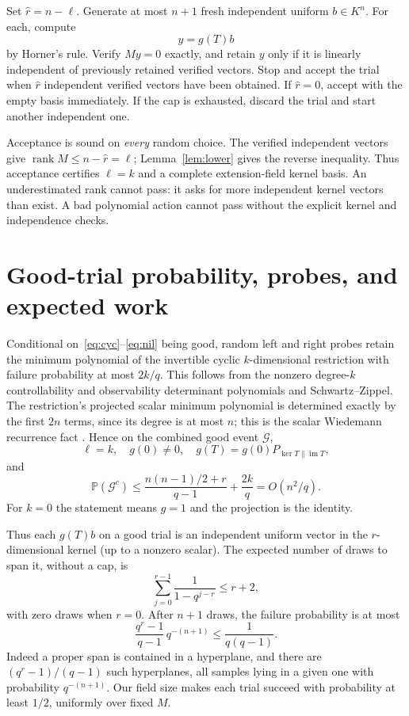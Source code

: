 \documentclass[11pt]{article}
\newcommand{\rank}{\operatorname{rank}}
\newcommand{\Prob}{\mathbb P}
\begin{document}
Set $\widehat r=n-\ell$. Generate at most $n+1$ fresh independent
uniform $b\in K^n$. For each, compute
\[
 y=g(T)b
\]
by Horner's rule. Verify $My=0$ exactly, and retain $y$ only if it
is linearly independent of previously retained verified vectors.
Stop and accept the trial when $\widehat r$ independent verified
vectors have been obtained. If $\widehat r=0$, accept with the empty
basis immediately. If the cap is exhausted, discard the trial and
start another independent one.

Acceptance is sound on \emph{every} random choice. The verified
independent vectors give $\rank M\le n-\widehat r=\ell$;
Lemma~\ref{lem:lower} gives the reverse inequality. Thus acceptance
certifies $\ell=k$ and a complete extension-field kernel basis.
An underestimated rank cannot pass: it asks for more independent
kernel vectors than exist. A bad polynomial action cannot pass
without the explicit kernel and independence checks.

\section{Good-trial probability, probes, and expected work}
Conditional on~\eqref{eq:cyc}--\eqref{eq:nil} being good, random
left and right probes retain the minimum polynomial of the invertible
cyclic $k$-dimensional restriction with failure probability at most
$2k/q$. This follows from the nonzero degree-$k$ controllability and
observability determinant polynomials and Schwartz--Zippel.
The restriction's projected scalar minimum polynomial is determined
exactly by the first $2n$ terms, since its degree is at most $n$;
this is the scalar Wiedemann recurrence fact \cite[Section II]{wiedemann}.
Hence on the combined good event $\mathcal G$,
\[
 \ell=k,\quad g(0)\ne0,\quad
 g(T)=g(0)P_{\ker T\parallel\operatorname{im}T},
\]
and
\begin{equation}\label{eq:bad}
 \Prob(\mathcal G^c)
 \le\frac{n(n-1)/2+r}{q-1}+\frac{2k}{q}
 =O(n^2/q).
\end{equation}
For $k=0$ the statement means $g=1$ and the projection is the identity.

Thus each $g(T)b$ on a good trial is an independent uniform vector
in the $r$-dimensional kernel (up to a nonzero scalar).
The expected number of draws to span it, without a cap, is
\[
 \sum_{j=0}^{r-1}\frac1{1-q^{j-r}}\le r+2,
\]
with zero draws when $r=0$.
After $n+1$ draws, the failure probability is at most
\begin{equation}\label{eq:cap}
 \frac{q^r-1}{q-1}\,q^{-(n+1)}
 \le\frac1{q(q-1)}.
\end{equation}
Indeed a proper span is contained in a hyperplane, and there are
$(q^r-1)/(q-1)$ such hyperplanes, all samples lying in a given one with probability
$q^{-(n+1)}$. Our field size makes each trial succeed with
probability at least $1/2$, uniformly over fixed $M$.
\end{document}
